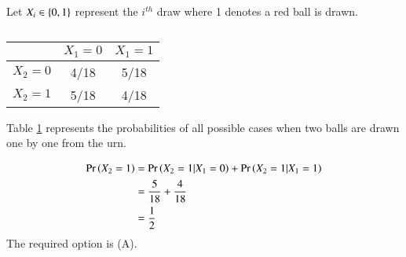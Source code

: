 Let $X_i \in \left\{0,1\right\}$ represent the $i^{th}$ draw where 1 denotes a red ball is drawn.

\begin{table}[h]
\centering 
\caption{}
\begin{tabular}{|c|c|c|}
\hline
           & $X_1 = 0$ & $X_1 = 1$\\
\hline
$X_2 = 0$  & 4/18      & 5/18  \\
\hline
$X_2 = 1$  & 5/18      & 4/18  \\
\hline
\end{tabular}
\label{table:}
\end{table}
 
Table \ref{table:} represents the probabilities of all possible cases when two balls are drawn one by one from the urn.

\begin{align}
    \Pr\left(X_2 = 1\right) &= \Pr\left(X_2 = 1|X_1 = 0\right)+\Pr\left(X_2 = 1|X_1 = 1\right)\\
                 &=\frac{5}{18}+\frac{4}{18} \\
                 &= \frac{1}{2}
\end{align}
The required option is (A).